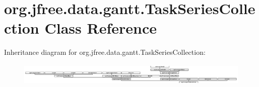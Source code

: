 \hypertarget{classorg_1_1jfree_1_1data_1_1gantt_1_1_task_series_collection}{}\section{org.\+jfree.\+data.\+gantt.\+Task\+Series\+Collection Class Reference}
\label{classorg_1_1jfree_1_1data_1_1gantt_1_1_task_series_collection}
Inheritance diagram for org.\+jfree.\+data.\+gantt.\+Task\+Series\+Collection\+:\begin{figure}[H]
\begin{center}
\leavevmode
\includegraphics[height=1.049672cm]{classorg_1_1jfree_1_1data_1_1gantt_1_1_task_series_collection}
\end{center}
\end{figure}
